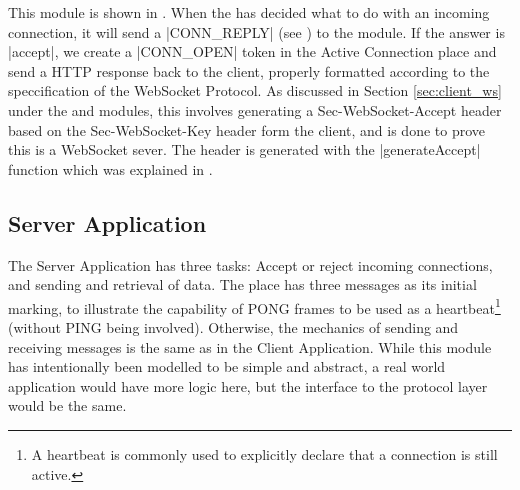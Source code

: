 		This module is shown in . When the  has decided what to do with an incoming connection, it will send
		a |CONN_REPLY| (see ) to the  module.
		If the answer is |accept|, we create a |CONN_OPEN| token in the
		Active Connection place and send a HTTP response back to the client, properly
		formatted according to the speccification of the WebSocket Protocol. As
		discussed in Section \ref{sec:client_ws} under the 
		and  modules, this involves generating a
		Sec-WebSocket-Accept header based on the Sec-WebSocket-Key header form the
		client, and is done to prove this is a WebSocket sever. The header is
		generated with the |generateAccept| function which was explained in
		.
		
\subsection{Server Application}
	
	
	The Server Application has three tasks: Accept or reject incoming connections,
	and sending and retrieval of data. The  place has three
	messages as its initial marking, to illustrate the capability of PONG frames
	to be used as a heartbeat\footnote{A heartbeat is commonly used to explicitly
	declare that a connection is still active.} (without PING being involved).
	Otherwise, the mechanics of sending and receiving messages is the same as in
	the Client Application. While this module has intentionally been modelled to be
	simple and abstract, a real world application would have more logic here, but
	the interface to the protocol layer would be the same.
